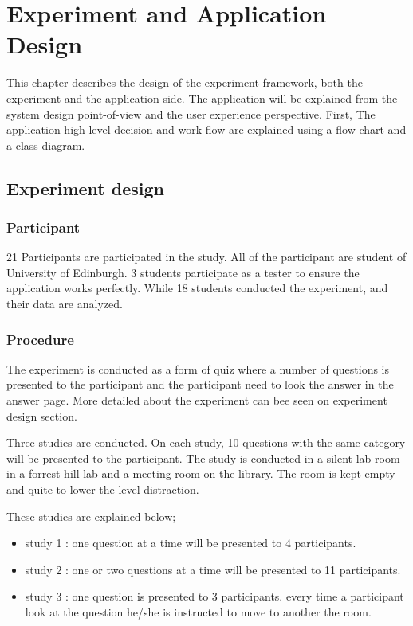 \chapter{Experiment and Application Design}




This chapter describes the design of the experiment framework, both the experiment and the application side.
The application will be explained from the system design point-of-view and the user experience perspective. First,
The application high-level decision and work flow are explained using a flow chart and a class diagram.



\section{Experiment design}
\subsection{Participant}
21 Participants are participated in the study. All of the participant are student of University of Edinburgh.
3 students participate as a tester to ensure the application works perfectly. While 18 students conducted the experiment, and their data are analyzed.

\subsection{Procedure}
The experiment is conducted as a form of quiz where a number of questions is presented to the participant and the participant need to look the answer in the answer page.
More detailed about the experiment can bee seen on experiment design section.

Three studies are conducted. On each study, 10 questions with the same category will be presented to the participant. The study is conducted in a silent lab
 room in a forrest hill lab and a meeting room on the library. The room is kept empty and quite to lower the level distraction.

These studies are explained below;
\begin{itemize}
\item study 1 : one question at a time will be presented to 4 participants.
\item study 2 : one or two questions at a time will be presented to 11 participants.
\item study 3 : one question is presented to 3 participants. every time a participant look at the question he/she is instructed to move to another the room.
\end{itemize}

